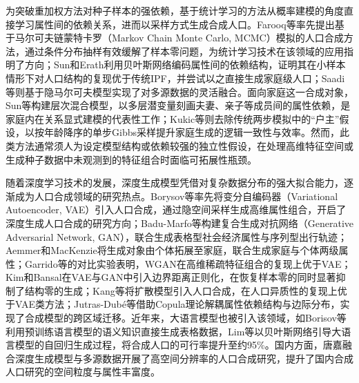 为突破重加权方法对种子样本的强依赖，基于统计学习的方法从概率建模的角度直接学习属性间的依赖关系，进而以采样方式生成合成人口。Farooq等\citep{farooqSimulationBasedPopulation2013}率先提出基于马尔可夫链蒙特卡罗（Markov Chain Monte Carlo, MCMC）模拟的人口合成方法，通过条件分布抽样有效缓解了样本零问题，为统计学习技术在该领域的应用指明了方向；Sun和Erath\citep{sunBayesianNetworkApproach2015}利用贝叶斯网络编码属性间的依赖结构，证明其在小样本情形下对人口结构的复现优于传统IPF，并尝试以之直接生成家庭级人口；Saadi等\citep{saadiHiddenMarkovModelbased2016}则基于隐马尔可夫模型实现了对多源数据的灵活融合。面向家庭这一合成对象，Sun等\citep{sunHierarchicalMixtureModeling2018}构建层次混合模型，以多层潜变量刻画夫妻、亲子等成员间的属性依赖，是家庭内在关系显式建模的代表性工作；Kukic等\citep{kukicOnestepGibbsSampling2024a}则去除传统两步模拟中的``户主''假设，以按年龄降序的单步Gibbs采样提升家庭生成的逻辑一致性与效率。然而，此类方法通常须人为设定模型结构或依赖较强的独立性假设，在处理高维特征空间或生成种子数据中未观测到的特征组合时面临可拓展性瓶颈\citep{laPopulationSynthesisProblembased2025}。

随着深度学习技术的发展，深度生成模型凭借对复杂数据分布的强大拟合能力，逐渐成为人口合成领域的研究热点。Borysov等\citep{borysovHowGenerateMicroagents2019}率先将变分自编码器（Variational Autoencoder, VAE）引入人口合成，通过隐空间采样生成高维属性组合，开启了深度生成人口合成的研究方向；Badu-Marfo等\citep{badu-marfoCompositeTravelGenerative2022}构建复合生成对抗网络（Generative Adversarial Network, GAN），联合生成表格型社会经济属性与序列型出行轨迹；Aemmer和MacKenzie\citep{aemmerGenerativePopulationSynthesis2022}将生成对象由个体拓展至家庭，联合生成家庭与个体两级属性；Garrido等\citep{garridoPredictionRareFeature2020}的对比实验表明，WGAN在高维稀疏特征组合的复现上优于VAE；Kim和Bansal\citep{kimDeepGenerativeModel2023}在VAE与GAN中引入边界距离正则化，在恢复样本零的同时显著抑制了结构零的生成；Kang等\citep{kangGeneratingPopulationSynthesis2023}将扩散模型引入人口合成，在人口异质性的复现上优于VAE类方法；Jutras-Dub\'e等\citep{jutras-dubeCopulabasedTransferableModels2024}借助Copula理论解耦属性依赖结构与边际分布，实现了合成模型的跨区域迁移。近年来，大语言模型也被引入该领域，如Borisov等\citep{borisovLanguageModelsAre2023}利用预训练语言模型的语义知识直接生成表格数据，Lim等\citep{limLargeLanguageModel2025}以贝叶斯网络引导大语言模型的自回归生成过程，将合成人口的可行率提升至约95\%。国内方面，唐嘉\citep{TangJiaJiYuShenDuShengChengMoXingHeDuoYuanShuJuDeGaoKongJianFenBianLuHeChengRenKouYanJiu2024}融合深度生成模型与多源数据开展了高空间分辨率的人口合成研究，提升了国内合成人口研究的空间粒度与属性丰富度。

